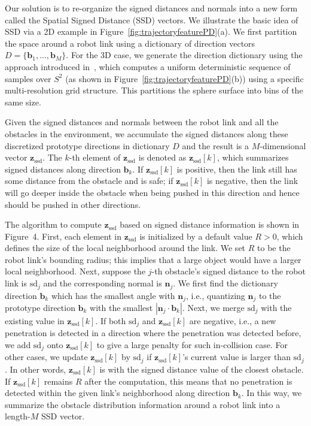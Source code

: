 \documentclass[letterpaper, 10 pt, conference]{ieeeconf}  %
\newcommand{\fssd}{\mbox{$\mathbf z_{\text{ssd}}$}}
\begin{document}
Our solution is to re-organize the signed distances and normals into a new form called the Spatial Signed Distance (SSD) vectors. We illustrate the basic idea of SSD via a 2D example in Figure~\ref{fig:trajectoryfeaturePD}(a). We first partition the space around a robot link using a dictionary of direction vectors $D = \{\mathbf b_1, ..., \mathbf b_M\}$.  For the 3D case, we generate the direction dictionary using the approach introduced in~\cite{Yershova:2010:GUI}, which computes a uniform deterministic sequence of samples over $S^2$ (as shown in Figure~\ref{fig:trajectoryfeaturePD}(b)) using a specific multi-resolution grid structure.  This partitions the sphere surface into bins of the same size.

Given the signed distances and normals between the robot link and all the obstacles in the environment, we accumulate the signed distances along these discretized prototype directions in dictionary $D$ and the result is a $M$-dimensional vector $\fssd$. The $k$-th element of $\fssd$ is denoted as $\fssd[k]$, which summarizes signed distances along direction $\mathbf b_k$. If $\fssd[k]$ is positive, then the link still has some distance from the obstacle and is safe; if $\fssd[k]$ is negative, then the link will go deeper inside the obstacle when being pushed in this direction and hence should be pushed in other directions. 


The algorithm to compute $\fssd$ based on signed distance information is shown in Figure~4. First, each element in $\fssd$ is initialized by a default value $R > 0$, which defines the size of the local neighborhood around the link. We set $R$ to be the robot link's bounding radius; this implies that a large object would have a larger local neighborhood. Next, suppose the $j$-th obstacle's signed distance to the robot link is $\text{sd}_j$ and the corresponding normal is $\mathbf n_j$. We first find the dictionary direction $\mathbf b_k$ which has the smallest angle with $\mathbf n_j$, i.e., quantizing $\mathbf n_j$ to the prototype direction $\mathbf b_k$ with the smallest $|\mathbf n_j \cdot \mathbf b_k|$. Next, we merge $\text{sd}_j$ with the existing value in $\fssd[k]$. If both $\text{sd}_j$ and $\fssd[k]$ are negative, i.e., a new penetration is detected in a direction where the penetration was detected before, we add $\text{sd}_j$ onto $\fssd[k]$ to give a large penalty for such in-collision case. For other cases, we update $\fssd[k]$ by $\text{sd}_j$ if $\fssd[k]$'s current value is larger than $\text{sd}_j$. In other words, $\fssd[k]$ is with the signed distance value of the closest obstacle. If $\fssd[k]$ remains $R$ after the computation, this means that no penetration is detected within the given link's neighborhood along direction $\mathbf b_k$. In this way, we summarize the obstacle distribution information around a robot link into a length-$M$ SSD vector.
\end{document}
